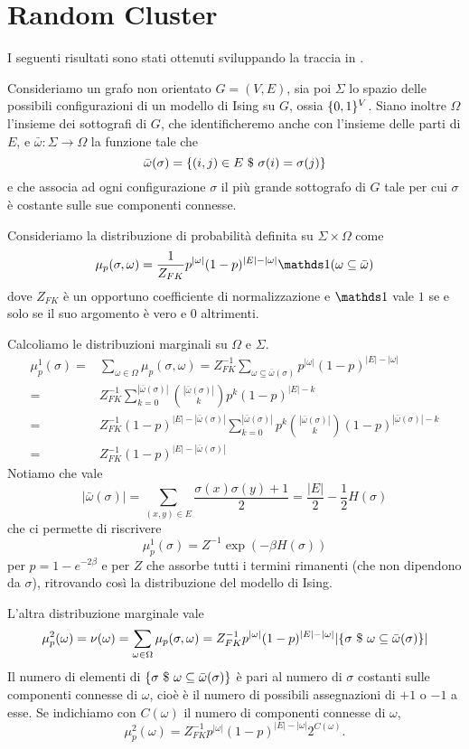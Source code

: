 \documentclass[]{marticle}
\begin{document}
\section{Random Cluster}
I seguenti risultati sono stati ottenuti sviluppando la traccia in
\cite{edwards-sokal}.

Consideriamo un grafo non orientato $G=(V,E)$, sia poi $\Sigma$ lo spazio delle
possibili configurazioni di un modello di Ising su $G$, ossia $\{0,1\}^V$.
Siano inoltre $\Omega$ l'insieme dei sottografi di $G$, che identificheremo
anche con l'insieme delle parti di $E$, e $\bar{\omega}\colon \Sigma
\longrightarrow \Omega$ la funzione tale che 
\[
    \bar{\omega}(\sigma) = \{(i,j)\in E \ \$\  \sigma(i) = \sigma(j)\}
\]
e che associa ad ogni configurazione $\sigma$ il pi\`u grande sottografo di $G$
tale per cui $\sigma$ \`e costante sulle sue componenti connesse.

Consideriamo la distribuzione di probabilit\`a definita su $\Sigma \times
\Omega$ come
\[
    \mu_p(\sigma, \omega) = \frac{1}{Z_{FK}} p^{|\omega|} (1-p)^{|E| - |\omega|}
    \ind(\omega \subseteq \bar{\omega})
\]
dove $Z_{FK}$ \`e un opportuno coefficiente di normalizzazione e $\ind$ vale $1$ se
e solo se il suo argomento \`e vero e $0$ altrimenti.

Calcoliamo le distribuzioni marginali su $\Omega$ e $\Sigma$.
\begin{align*}
    \mu^1_p(\sigma) =& \sum_{\omega\in\Omega} \mu_p(\sigma,\omega) = 
    Z_{FK}^{-1} \sum_{\omega\subseteq\bar{\omega}(\sigma)}  p^{|\omega|}
    (1-p)^{|E| - |\omega|} \\
    =& Z_{FK}^{-1} \sum_{k=0}^{|\bar{\omega}(\sigma)|}
        \binom{|\bar{\omega}(\sigma)|}{k}
        p^k (1-p)^{|E| - k} \\
    =& Z_{FK}^{-1} (1-p)^{|E|-|\bar{\omega}(\sigma)|}
        \sum_{k=0}^{|\bar{\omega}(\sigma)|}  p^k
        \binom{|\bar{\omega}(\sigma)|}{k}
        (1-p)^{|\bar{\omega}(\sigma)| - k} \\
    =& Z_{FK}^{-1} (1-p)^{|E|-|\bar{\omega}(\sigma)|}
\end{align*}
Notiamo che vale
\[
    |\bar{\omega}(\sigma)| = \sum_{(x,y)\in E} \frac{\sigma(x) \sigma(y) +
    1}{2} = \frac{|E|}{2} - \frac{1}{2}H(\sigma)
\]
che ci permette di riscrivere
\[
    \mu^1_p(\sigma) = Z^{-1} \exp(-\beta H(\sigma))
\]
per $p = 1-e^{-2\beta}$ e per $Z$ che assorbe tutti i termini rimanenti (che non
dipendono da $\sigma$), ritrovando cos\`i la distribuzione del modello di Ising.

L'altra distribuzione marginale vale
\[
    \mu^2_p(\omega) = \nu(\omega) = \sum_{\omega\in\Omega} \mu_p(\sigma,\omega)
    = Z_{FK}^{-1} p^{|\omega|} (1-p)^{|E| - |\omega|} |\{\sigma \ \$\ 
    \omega\subseteq\bar{\omega}(\sigma)\}|
\]
Il numero di elementi di $\{\sigma \ \$\ 
\omega\subseteq\bar{\omega}(\sigma)\}$ \`e pari al numero di $\sigma$ costanti
sulle componenti connesse di $\omega$, cio\`e \`e il numero di possibili
assegnazioni di $+1$ o $-1$ a esse. Se indichiamo con $C(\omega)$ il numero di
componenti connesse di $\omega$,
\[
    \mu^2_p(\omega) = 
    Z_{FK}^{-1} p^{|\omega|} (1-p)^{|E| - |\omega|} 2^{C(\omega)}.
\]
\end{document}
